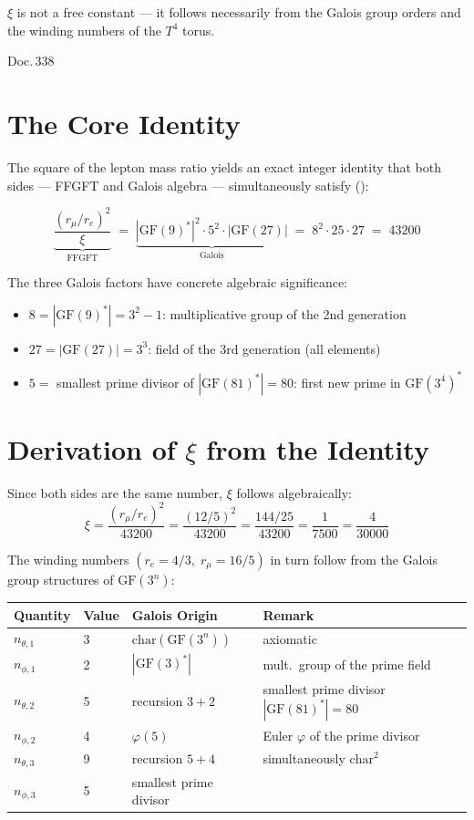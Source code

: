 \label{ch:xi_galois}

\epigraph{$\xi$ is not a free constant --- it follows necessarily from the
Galois group orders and the winding numbers of the $T^4$ torus.}{Doc.\,338}

\section{The Core Identity}

The square of the lepton mass ratio yields an exact integer
identity that both sides --- FFGFT and Galois algebra --- simultaneously
satisfy ():

\[
\boxed{
  \underbrace{\frac{(r_\mu/r_e)^2}{\xi}}_{\text{FFGFT}}
  \;=\;
  \underbrace{|\mathrm{GF}(9)^*|^2 \cdot 5^2 \cdot |\mathrm{GF}(27)|}_{\text{Galois}}
  \;=\; 8^2 \cdot 25 \cdot 27 \;=\; 43200
}
\]

The three Galois factors have concrete algebraic significance:
\begin{itemize}
  \item $8 = |\mathrm{GF}(9)^*| = 3^2 - 1$: multiplicative group of the 2nd generation
  \item $27 = |\mathrm{GF}(27)| = 3^3$: field of the 3rd generation (all elements)
  \item $5 = $ smallest prime divisor of $|\mathrm{GF}(81)^*| = 80$:
    first new prime in $\mathrm{GF}(3^4)^*$
\end{itemize}

\section{Derivation of \texorpdfstring{$\xi$}{xi} from the Identity}

Since both sides are the same number, $\xi$ follows algebraically:
\[
  \xi = \frac{(r_\mu/r_e)^2}{43200}
  = \frac{(12/5)^2}{43200}
  = \frac{144/25}{43200}
  = \frac{1}{7500}
  = \frac{4}{30000}
\]

The winding numbers $(r_e = 4/3,\; r_\mu = 16/5)$ in turn follow
from the Galois group structures of $\mathrm{GF}(3^n)$:

\begin{center}
\begingroup\small
\begin{tabular}{@{}p{1.2cm}p{0.8cm}p{2.8cm}p{2.8cm}@{}}
\toprule
Quantity & Value & Galois Origin & Remark \\
\midrule
$n_{\theta,1}$ & 3 & $\mathrm{char}(\mathrm{GF}(3^n))$ & axiomatic \\
$n_{\phi,1}$   & 2 & $|\mathrm{GF}(3)^*|$ & mult.\ group of the prime field \\
$n_{\theta,2}$ & 5 & recursion $3+2$ & smallest prime divisor $|\mathrm{GF}(81)^*|=80$ \\
$n_{\phi,2}$   & 4 & $\varphi(5)$ & Euler $\varphi$ of the prime divisor \\
$n_{\theta,3}$ & 9 & recursion $5+4$ & simultaneously $\mathrm{char}^2$ \\
$n_{\phi,3}$   & 5 & smallest prime divisor & \\
\bottomrule
\end{tabular}
\endgroup
\end{center}

